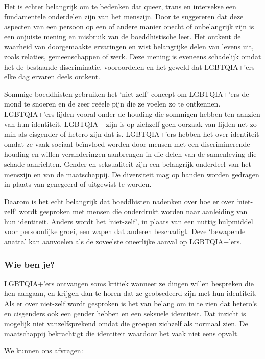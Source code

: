 \documentclass[12pt,openany]{book}
\begin{document}
Het is echter belangrijk om te bedenken dat queer, trans en intersekse een fundamentele onderdelen zijn van het menszijn. Door te suggereren dat deze aspecten van een persoon op een of andere manier onecht of onbelangrijk zijn is een onjuiste mening en misbruik van de boeddhistische leer. Het ontkent de waarheid van doorgemaakte ervaringen en wist belangrijke delen van levens uit, zoals relaties, gemeenschappen of werk. Deze mening is eveneens schadelijk omdat het de bestaande discriminatie, vooroordelen en het geweld dat LGBTQIA+’ers elke dag ervaren deels ontkent. 

Sommige boeddhisten gebruiken het ‘niet-zelf’ concept om LGBTQIA+’ers de mond te snoeren en de zeer reëele pijn die ze voelen zo te ontkennen. LGBTQIA+’ers lijden vooral onder de houding die sommigen hebben ten aanzien van hun identiteit. LGBTQIA+ zijn is op zichzelf geen oorzaak van lijden net zo min als cisgender of hetero zijn dat is. LGBTQIA+’ers hebben het over identiteit omdat ze vaak sociaal beïnvloed worden door mensen met een discriminerende houding en willen veranderingen aanbrengen in die delen van de samenleving die schade aanrichten. Gender en seksualiteit zijn een belangrijk onderdeel van het menszijn en van de maatschappij. De diversiteit mag op handen worden gedragen in plaats van genegeerd of uitgewist te worden. 

Daarom is het echt belangrijk dat boeddhisten nadenken over hoe er over ‘niet-zelf’ wordt gesproken met mensen die onderdrukt worden naar aanleiding van hun identiteit. Anders wordt het ‘niet-zelf’, in plaats van een nuttig hulpmiddel voor persoonlijke groei, een wapen dat anderen beschadigt. Deze ‘bewapende anatta’ kan aanvoelen als de zoveelste oneerlijke aanval op LGBTQIA+’ers.  

\subsubsection*{Wie ben je?}

LGBTQIA+’ers ontvangen soms kritiek wanneer ze dingen willen bespreken die hen aangaan, en krijgen dan te horen dat ze geobsedeerd zijn met hun identiteit. Als er over niet-zelf wordt gesproken is het van belang om in te zien dat hetero’s en cisgenders ook een gender hebben en een seksuele identiteit. Dat inzicht is mogelijk niet vanzelfsprekend omdat die groepen zichzelf als normaal zien.  De maatschappij bekrachtigt die identiteit waardoor het vaak niet eens opvalt.

We kunnen ons afvragen:
\end{document}
